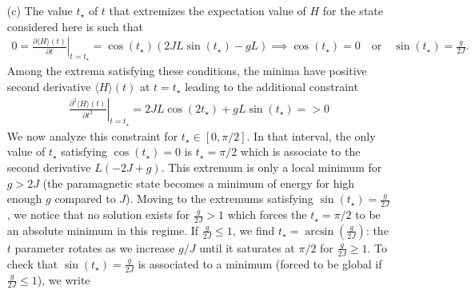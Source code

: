 \documentclass[10pt, a4paper]{article}
\begin{document}
{\begin{enumerate}
\begin{align*}
  \end{align*}
  Then the expectation value of the transverse field term can be written as 
  \begin{align*}
    &\sum_{i=0}^{L-1}\left((\cos(t/2) + \sin(t/2))\frac{\bra{+}_i}{\sqrt{2}}+(\cos(t/2)-\sin(t/2))\frac{\bra{-}_i}{\sqrt{2}}\right) \left(- g  X_i\right)\left((\cos(t/2) + \sin(t/2))\frac{\ket{+}_i}{\sqrt{2}}+(\cos(t/2)-\sin(t/2))\frac{\ket{-}_i}{\sqrt{2}}\right)\langle{\neq i}|{\neq i}\rangle \\
    &= -g \sum_{i=0}^{L-1} \left((\cos(t/2) + \sin(t/2))\frac{\bra{+}_i}{\sqrt{2}}+(\cos(t/2)-\sin(t/2))\frac{\bra{-}_i}{\sqrt{2}}\right) \left((\cos(t/2) + \sin(t/2))\frac{\ket{+}_i}{\sqrt{2}}-(\cos(t/2)-\sin(t/2))\frac{\ket{-}_i}{\sqrt{2}}\right)\\
    &= -g \sum_{i=0}^{L-1} \left((\cos(t/2) + \sin(t/2))^2\frac{1}{2} - (\cos(t/2) - \sin(t/2))^2\frac{1}{2}\right) = -2g L\sin(t/2)\cos(t/2) = -gL \sin(t)
  \end{align*}
  which evaluates to $-gL$ at $t = \pi/2$ (as expected for a fully paramagnetic spin chain). The expectation value of the full Hamiltonian is 
  \begin{align*}
    \langle H \rangle(t) =-JL\cos^2(t) - gL \sin(t). 
  \end{align*}
  \newpage
  \item[(c)] The value $t_\star$ of $t$ that extremizes the expectation value of $H$ for the state considered here is such that 
  \begin{align*}
    0 = \left.\frac{\partial \langle H \rangle(t)}{\partial t}\right|_{t = t_\star} = \cos(t_\star) (2JL\sin(t_\star) - gL) \implies  \cos(t_\star) = 0 \quad \text{or} \quad \sin(t_\star) = \frac{g}{2J}. 
  \end{align*}
  Among the extrema satisfying these conditions, the minima have positive second derivative $\langle H \rangle(t)$ at $t=t_\star$ leading to the additional constraint 
  \begin{align*}
    \left.\frac{\partial^2 \langle H \rangle(t)}{\partial t^2}\right|_{t = t_\star} = 2JL\cos(2t_\star) + gL \sin(t_\star) = > 0 
  \end{align*}
  We now analyze this constraint for $t_\star \in [0, \pi/2]$. In that interval, the only value of $t_\star$ satisfying $\cos(t_\star) = 0$ is $t_\star = \pi/2$ which is associate to the second derivative $L(-2J + g)$. This extremum is only a local minimum for $g > 2J$ (the paramagnetic state becomes a minimum of energy for high enough $g$ compared to $J$). Moving to the extremums satisfying $\sin(t_\star) = \frac{g}{2J}$, we notice that no solution exists for $\frac{g}{2J}>1$ which forces the $t_\star = \pi/2$ to be an absolute minimum in this regime. If $\frac{g}{2J}\leq 1$, we find $t_\star = \arcsin(\frac{g}{2J})$: the $t$ parameter rotates as we increase $g/J$ until it saturates at $\pi/2$ for $\frac{g}{2J}\ge 1$. To check that $\sin(t_\star) = \frac{g}{2J}$ is associated to a minimum (forced to be global if $\frac{g}{2J}\leq 1$), we write 

\end{enumerate}}
\end{document}
